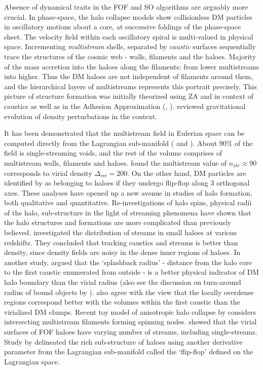 Absence of dynamical traits in the FOF and SO algorithms are arguably more crucial. In phase-space, the halo collapse models show collisionless DM particles in oscillatory motions about a core, at successive foldings of the phase-space sheet. The velocity field within each oscillatory spiral is multi-valued in physical space. Incrementing {\it multistream} shells, separated by {\it caustic} surfaces sequentially trace the structures of the cosmic web - walls, filaments and the haloes. Majority of the mass accretion into the haloes along the filaments: from lower multistreams into higher. Thus the DM haloes are not independent of filaments around them, and the hierarchical layers of multistreams represents this portrait precisely. This picture of structure formation was initially theorized using ZA \cite{Zeldovich1970} and in context of caustics \cite{Arnold1982} as well as in the Adhesion Approximation (\citealt{Gurbatov1989}, \citealt{Kofman1992}). 
\cite{Shandarin1989} reviewed gravitational evolution of density perturbations in the context.  

It has been demonstrated that the multistream field in Eulerian space can be computed directly from the Lagrangian sub-manifold (\citealt{Shandarin2012} and \citealt{Abel2012}). About 90\% of the field is single-streaming voids, and the rest of the volume comprises of multistream walls, filaments and haloes. \cite{Ramachandra2015} found the multistream value of $n_{str} \approx 90$ corresponds to virial density $\Delta_{vir} = 200$. On the other hand, DM particles are identified by \citep{Falck2012} as belonging to haloes if they undergo flip-flop along 3 orthogonal axes. These analyses have opened up a new avenue in studies of halo formation, both qualitative and quantitative. Re-investigations of halo spins, physical radii of the halo, sub-structure in the light of streaming phenomena have shown that the halo structures and formations are more complicated than previously believed. \cite{Vogelsberger2011} investigated the distribution of streams in small haloes at various redshifts. They concluded that tracking caustics and streams is better than density, since density fields are noisy in the dense inner regions of haloes. In another study, \cite{More2015} argued that the `splashback radius' - distance from the halo core to the first caustic enumerated from outside - is a better physical indicator of DM halo boundary than the virial radius (also see the discussion on turn-around radius of bound objects by \citealt{Lee2016a}). \cite{Angulo2013a} also agree with the view that the locally overdense regions correspond better with the volumes within the first caustic than the virialized DM clumps. Recent toy model of anisotropic halo collapse by \cite{Neyrinck2016} considers intersecting multistream filaments forming spinning nodes. \cite{Ramachandra2017} showed that the virial surfaces of FOF haloes have varying number of streams, including single-streams. Study by \cite{Shandarin2016} delineated the rich sub-structure of haloes using another derivative parameter from the Lagrangian sub-manifold called the `flip-flop' defined on the Lagrangian space. 


